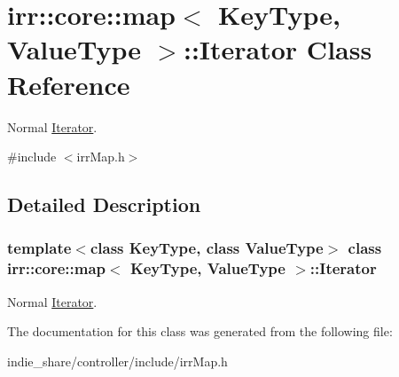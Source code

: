 \hypertarget{classirr_1_1core_1_1map_1_1Iterator}{}\section{irr\+:\+:core\+:\+:map$<$ Key\+Type, Value\+Type $>$\+:\+:Iterator Class Reference}
\label{classirr_1_1core_1_1map_1_1Iterator}


Normal \hyperlink{classirr_1_1core_1_1map_1_1Iterator}{Iterator}.  




{\ttfamily \#include $<$irr\+Map.\+h$>$}



\subsection{Detailed Description}
\subsubsection*{template$<$class Key\+Type, class Value\+Type$>$\newline
class irr\+::core\+::map$<$ Key\+Type, Value\+Type $>$\+::\+Iterator}

Normal \hyperlink{classirr_1_1core_1_1map_1_1Iterator}{Iterator}. 

The documentation for this class was generated from the following file\+:\begin{DoxyCompactItemize}
\item 
indie\+\_\+share/controller/include/irr\+Map.\+h\end{DoxyCompactItemize}
